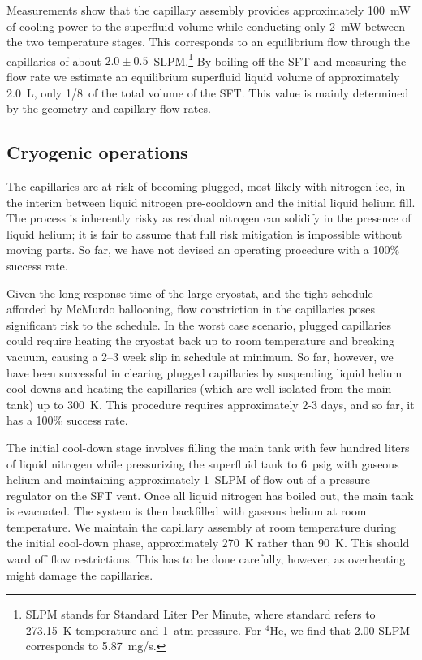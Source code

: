 \documentclass[
12pt, %
letterpaper, %
oneside, %
headinclude, footinclude, %
BCOR5mm, %
]{scrartcl}
\newcommand{\hen}{$^4\mathrm{He}$}
\begin{document}
Measurements show that the capillary assembly provides approximately
100~mW of cooling power to the superfluid volume while conducting only
2~mW between the two temperature stages. This corresponds to an
equilibrium flow through the capillaries of about $2.0\pm0.5$~SLPM.\footnote{
SLPM stands for Standard Liter Per Minute, where standard refers to 
273.15~K temperature and 1~atm pressure. For \hen, we find that 2.00 SLPM corresponds to 5.87~mg/s.} 
By boiling off the SFT and measuring the flow rate we estimate an
equilibrium superfluid liquid volume of approximately 2.0~L, only 1/8~of the
total volume of the SFT. This value is mainly determined by the
geometry and capillary flow rates.

\subsection{Cryogenic operations}


The capillaries are at risk of becoming plugged, most likely with nitrogen ice, in the interim between liquid nitrogen pre-cooldown and the initial liquid helium fill. The process is inherently risky as residual nitrogen can solidify in the presence of liquid helium; it is fair to assume that full risk mitigation is impossible without moving parts. So far, we have not devised an operating procedure with a 100\% success rate.

Given the long response time of the large cryostat, and the tight schedule afforded by McMurdo ballooning, flow constriction in the capillaries poses significant risk to the schedule. In the worst case scenario, plugged capillaries could require heating the cryostat back up to room temperature and breaking vacuum, causing a 2--3 week slip in schedule at minimum. So far, however, we have been successful in clearing plugged capillaries by suspending liquid helium cool downs and heating the capillaries (which are well isolated from the main tank) up to 300~K. This procedure requires approximately 2-3 days, and so far, it has a 100\% success rate. 

The initial cool-down stage involves filling the main tank with few hundred liters of liquid nitrogen while pressurizing the superfluid tank to 6~psig with gaseous helium and maintaining approximately 1~SLPM of flow out of a pressure regulator on the SFT vent. Once all liquid nitrogen has boiled out, the main tank is evacuated. The system is then backfilled with gaseous helium at room temperature. We maintain the capillary assembly at room temperature during the initial cool-down phase, approximately 270~K rather than 90~K. This should ward off  flow restrictions. This has to be done carefully, however, as overheating might damage the capillaries.
\end{document}
